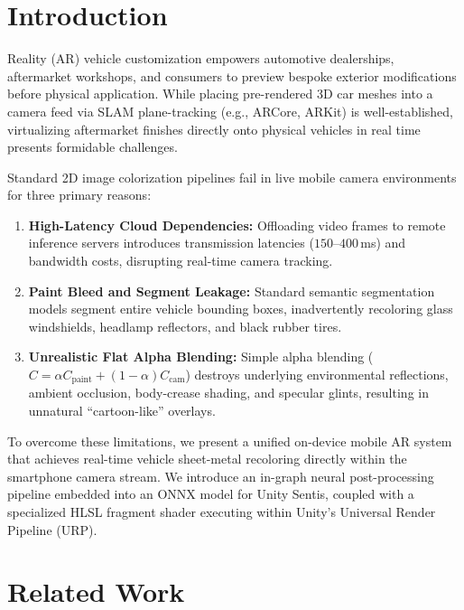 \documentclass[10pt,journal,compsoc]{IEEEtran}
\begin{document}
\maketitle
\IEEEdisplaynontitleabstractindextext
\IEEEpeerreviewmaketitle

\section{Introduction}
 Reality (AR) vehicle customization empowers automotive dealerships, aftermarket workshops, and consumers to preview bespoke exterior modifications before physical application. While placing pre-rendered 3D car meshes into a camera feed via SLAM plane-tracking (e.g., ARCore, ARKit) is well-established, virtualizing aftermarket finishes directly onto physical vehicles in real time presents formidable challenges.

Standard 2D image colorization pipelines fail in live mobile camera environments for three primary reasons:
\begin{enumerate}
    \item \textbf{High-Latency Cloud Dependencies:} Offloading video frames to remote inference servers introduces transmission latencies ($150$--$400\,$ms) and bandwidth costs, disrupting real-time camera tracking.
    \item \textbf{Paint Bleed and Segment Leakage:} Standard semantic segmentation models segment entire vehicle bounding boxes, inadvertently recoloring glass windshields, headlamp reflectors, and black rubber tires.
    \item \textbf{Unrealistic Flat Alpha Blending:} Simple alpha blending ($C = \alpha C_{\text{paint}} + (1-\alpha) C_{\text{cam}}$) destroys underlying environmental reflections, ambient occlusion, body-crease shading, and specular glints, resulting in unnatural ``cartoon-like'' overlays.
\end{enumerate}

To overcome these limitations, we present a unified on-device mobile AR system that achieves real-time vehicle sheet-metal recoloring directly within the smartphone camera stream. We introduce an in-graph neural post-processing pipeline embedded into an ONNX model for Unity Sentis, coupled with a specialized HLSL fragment shader executing within Unity's Universal Render Pipeline (URP).

\section{Related Work}
\end{document}
